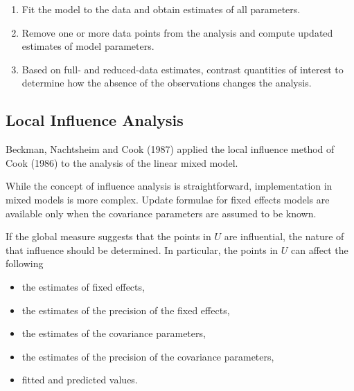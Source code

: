 \begin{enumerate}
	\item Fit the model to the data and obtain estimates of all parameters.
	\item Remove one or more data points from the analysis and compute updated estimates of model parameters.
	\item Based on full- and reduced-data estimates, contrast quantities of interest to determine how the absence of the observations changes the analysis.
\end{enumerate}

\subsection{Local Influence Analysis}



Beckman, Nachtsheim and Cook (1987)  applied the local influence method of Cook (1986) to the analysis of the linear mixed model.

While the concept of influence analysis is straightforward, implementation in mixed models is more complex. Update formulae for fixed effects models are available only when the covariance parameters are assumed to be known.

If the global measure suggests that the points in $U$ are influential, the nature of that influence should be determined. In particular, the points in $U$ can affect the following

\begin{itemize}
	\item the estimates of fixed effects,
	\item the estimates of the precision of the fixed effects,
	\item the estimates of the covariance parameters,
	\item the estimates of the precision of the covariance parameters,
	\item fitted and predicted values.
\end{itemize}



\newpage
